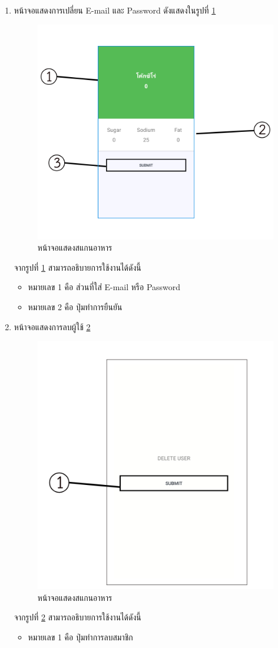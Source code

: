 \begin{enumerate}
						\item  หน้าจอแสดงการเปลี่ยน E-mail และ Password ดังแสดงในรูปที่ \ref{Fig:change}
						\begin{figure}[H]
							\centering
							\includegraphics[width=0.5\columnwidth]{Figures/7/teach/6.png}
							\caption{หน้าจอแสดงสแกนอาหาร}
							\label{Fig:change}
						\end{figure}
					จากรูปที่ \ref{Fig:change} สามารถอธิบายการใช้งานได้ดังนี้
						\begin{itemize}[label={--}]
							\item หมายเลข 1 คือ ส่วนที่ใส่่ E-mail หรือ Password
							\item หมายเลข 2 คือ ปุ่มทำการยืนยัน
							\end{itemize}
							
							\item  หน้าจอแสดงการลบผู้ใช้ \ref{Fig:del}
							\begin{figure}[H]
								\centering
								\includegraphics[width=0.5\columnwidth]{Figures/7/teach/10.png}
								\caption{หน้าจอแสดงสแกนอาหาร}
								\label{Fig:del}
							\end{figure}
						จากรูปที่ \ref{Fig:del} สามารถอธิบายการใช้งานได้ดังนี้
							\begin{itemize}[label={--}]
								\item หมายเลข 1 คือ ปุ่มทำการลบสมาชิก
								\end{itemize}



\end{enumerate}
